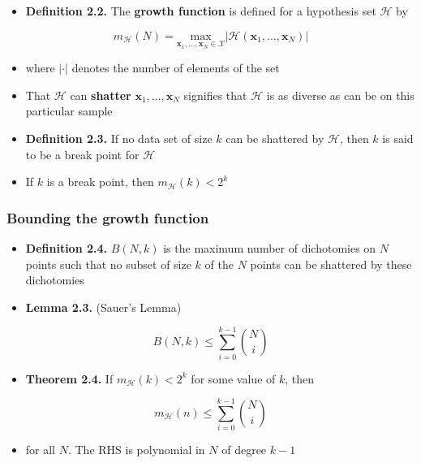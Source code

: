 \documentclass[11pt]{article}
\begin{document}
\begin{itemize}
\item \textbf{Definition 2.2.} The \textbf{growth function} is defined for a hypothesis set \(\mathcal H\) by
\end{itemize}
\begin{equation}
  m_\mathcal{H}(N) = \underset{\pmb x_1, \dots, \pmb x_N \in \mathcal X}{\text{max}} | \mathcal H(\pmb x_1, \dots, \pmb x_N)|
\end{equation}
\begin{itemize}
\item where \(|\cdot|\) denotes the number of elements of the set

\item That \(\mathcal H\) can \textbf{shatter} \(\pmb x_1, \dots, \pmb x_N\) signifies that \(\mathcal H\) is as diverse as can be on this particular sample

\item \textbf{Definition 2.3.} If no data set of size \(k\) can be shattered by \(\mathcal H\), then \(k\) is said to be a break point for \(\mathcal H\)

\item If \(k\) is a break point, then \(m_\mathcal{H}(k) < 2^k\)
\end{itemize}

\subsubsection{Bounding the growth function}
\label{sec:org5da44ec}
\begin{itemize}
\item \textbf{Definition 2.4.} \(B(N,k)\) is the maximum number of dichotomies on \(N\) points such that no subset of size \(k\) of the \(N\) points can be shattered by these dichotomies

\item \textbf{Lemma 2.3.} (Sauer's Lemma)
\end{itemize}
\begin{equation}
  B(N,k) \leq \sum_{i=0}^{k-1}\binom N i
\end{equation}

\begin{itemize}
\item \textbf{Theorem 2.4.} If \(m_\mathcal H (k) < 2^k\) for some value of \(k\), then
\end{itemize}
\begin{equation}
  m_\mathcal H (n) \leq \sum_{i=0}^{k-1} \binom N i
\end{equation}
\begin{itemize}
\item for all \(N\). The RHS is polynomial in \(N\) of degree \(k-1\)
\end{itemize}
\end{document}
